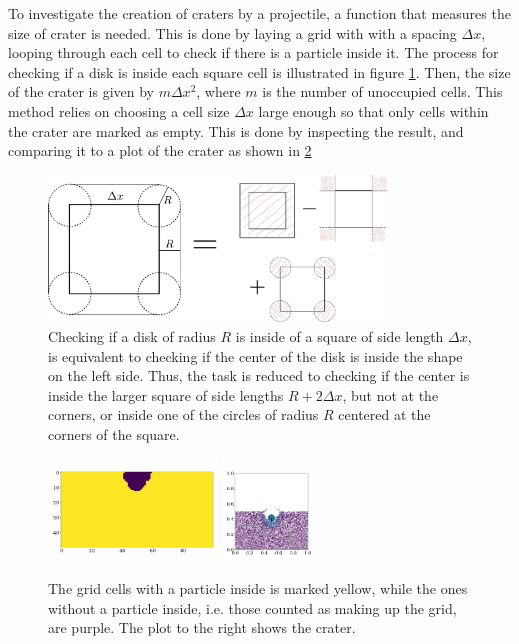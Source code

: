 \documentclass{article}
\begin{document}
        To investigate the creation of craters by a projectile, a function that measures the size of crater is needed. This is done by laying a grid with with a spacing $\Delta x$, looping through each cell to check if there is a particle inside it. The process for checking if a disk is inside each square cell is illustrated in figure \ref{check if disk is inside}. Then, the size of the crater is given by $m \Delta x^2$, where $m$ is the number of unoccupied cells. This method relies on choosing a cell size $\Delta x$ large enough so that only cells within the crater are marked as empty. This is done by inspecting the result, and comparing it to a plot of the crater as shown in \ref{crater}

            \begin{figure}[ht]
                \centering
                \includegraphics[width=0.8\textwidth]{figure.pdf}
                \caption{Checking if a disk of radius $R$ is inside of a square of side length $\Delta x$, is equivalent to checking if the center of the disk is inside the shape on the left side. Thus, the task is reduced to checking if the center is inside the larger square of side lengths $R + 2 \Delta x$, but not at the corners, or inside one of the circles of radius $R$ centered at the corners of the square.}
                \label{check if disk is inside}
            \end{figure}
            \begin{figure}[h]
                \centering
                \includegraphics[width=0.40\textwidth]{../plots/problem4/crater9.pdf}
                \includegraphics[width=0.22\textwidth]{../plots/problem4/particles9.pdf}
                \caption{The grid cells with a particle inside is marked yellow, while the ones without a particle inside, i.e. those counted as making up the grid, are purple. The plot to the right shows the crater.}
                \label{crater}
            \end{figure}
\end{document}
